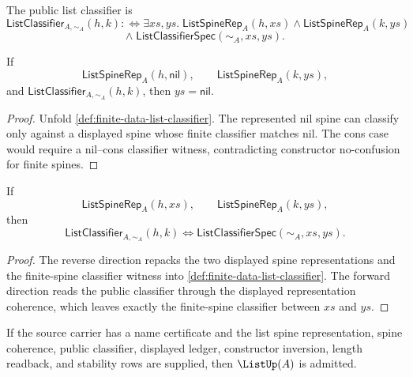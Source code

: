 \begin{definition}
\label{def:finite-data-list-classifier}
The public list classifier is
$$
\mathsf{ListClassifier}_{A,\sim_A}(h,k)
:\Longleftrightarrow
\exists xs,ys.\;
\mathsf{ListSpineRep}_A(h,xs)
\wedge
\mathsf{ListSpineRep}_A(k,ys)
$$
$$
\wedge\;
\mathsf{ListClassifierSpec}(\sim_A,xs,ys).
$$
\end{definition}

\begin{theorem}
\label{thm:finite-data-list-nil-inversion}
If
$$
\mathsf{ListSpineRep}_A(h,\mathsf{nil}),
\qquad
\mathsf{ListSpineRep}_A(k,ys),
$$
and $\mathsf{ListClassifier}_{A,\sim_A}(h,k)$, then
$ys=\mathsf{nil}$.
\end{theorem}

\begin{proof}
Unfold \autoref{def:finite-data-list-classifier}.  The represented nil
spine can classify only against a displayed spine whose finite classifier
matches nil.  The cons case would require a nil--cons classifier witness,
contradicting constructor no-confusion for finite spines.
\end{proof}

\begin{theorem}
\label{thm:finite-data-list-displayed-exactness}
If
$$
\mathsf{ListSpineRep}_A(h,xs),
\qquad
\mathsf{ListSpineRep}_A(k,ys),
$$
then
$$
\mathsf{ListClassifier}_{A,\sim_A}(h,k)
\Longleftrightarrow
\mathsf{ListClassifierSpec}(\sim_A,xs,ys).
$$
\end{theorem}

\begin{proof}
The reverse direction repacks the two displayed spine representations and
the finite-spine classifier witness into
\autoref{def:finite-data-list-classifier}.  The forward direction reads the
public classifier through the displayed representation coherence, which
leaves exactly the finite-spine classifier between $xs$ and $ys$.
\end{proof}

\begin{corollary}
\label{cor:finite-data-list-admission}
If the source carrier has a name certificate and the list spine
representation, spine coherence, public classifier, displayed ledger,
constructor inversion, length readback, and stability rows are supplied, then
$\ListUp(A)$ is admitted.
\end{corollary}

